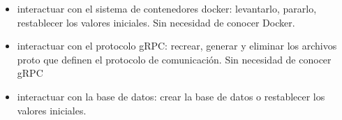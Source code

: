 \begin{itemize}
    \item interactuar con el sistema de contenedores docker: levantarlo, pararlo, restablecer los valores iniciales.
    Sin necesidad de conocer Docker.
    \item interactuar con el protocolo gRPC: recrear, generar y eliminar los archivos proto que definen el protocolo de comunicación.
    Sin necesidad de conocer gRPC
    \item interactuar con la base de datos: crear la base de datos o restablecer los valores iniciales.
\end{itemize}
